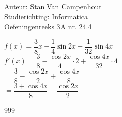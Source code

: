\documentclass[a4paper]{article}
\begin{document}
  
\noindent \large Auteur: Stan Van Campenhout \\
\noindent \large Studierichting:  Informatica\\
\noindent \large Oefeningenreeks 3A nr. 24.4\\

\medskip

\normalsize

$ f(x) = \dfrac{3}{8}x - \dfrac{1}{4}\sin2x + \dfrac{1}{32}\sin4x $\\

$ f'(x) = \dfrac{3}{8} - \dfrac{\cos2x}{4} \cdot 2 + \dfrac{\cos4x}{32} \cdot 4 $\\

$ = \dfrac{3}{8} - \dfrac{\cos2x}{2} + \dfrac{\cos4x}{8} $\\

$ = \dfrac{3 + \cos4x}{8} - \dfrac{\cos2x}{2} $\\

\begin{thebibliography}{999}
\end{thebibliography}
\end{document}
